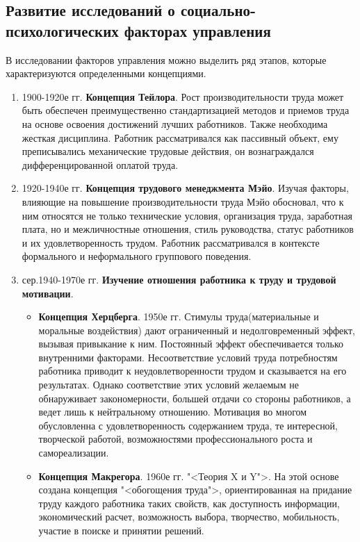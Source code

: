 \subsection{Развитие исследований о социально-психологических факторах управления}
В исследовании факторов управления можно выделить ряд этапов, которые характеризуются определенными концепциями. 
\begin{enumerate}
	\item 1900-1920е гг. \textbf{Концепция Тейлора}. Рост производительности труда может быть обеспечен преимущественно стандартизацией методов и приемов труда на основе освоения достижений лучших работников. Также необходима жесткая дисциплина. Работник рассматривался как пассивный объект, ему преписывались механические трудовые действия, он вознаграждался дифференцированной оплатой труда.
	\item 1920-1940е гг. \textbf{Концепция трудового менеджмента Мэйо}. Изучая факторы, влияющие на повышение производительности труда Мэйо обосновал, что к ним относятся не только технические условия, организация труда, заработная плата, но и межличностные отношения, стиль руководства, статус работников и их удовлетворенность трудом. Работник рассматривался в контексте формального и неформального группового поведения.
	\item сер.1940-1970е гг. \textbf{Изучение отношения работника к труду и трудовой мотивации}. 
	\begin{itemize}
		\item \textbf{Концепция Херцберга}. 1950е гг. Стимулы труда(материальные и моральные воздействия) дают ограниченный и недолговременный эффект, вызывая привыкание к ним. Постоянный эффект обеспечивается только внутренними факторами. Несоответствие условий труда потребностям работника приводит к неудовлетворенности трудом и сказывается на его результатах. Однако соответствие этих условий желаемым не обнаруживает закономерности, большей отдачи со стороны работников, а ведет лишь к нейтральному отношению. Мотивация во многом обусловленна с удовлетворенность содержанием труда, те интересной, творческой работой, возможностями профессионального роста и самореализации.
		\item \textbf{Концепция Макрегора}. 1960е гг. "<Теория X и Y">. На этой основе создана концепция "<обогощения труда">, ориентированная на придание труду каждого работника таких свойств, как доступность информации, экономический расчет, возможность выбора, творчество, мобильность, участие в поиске и принятии решений.
	\end{itemize}

\end{enumerate}
